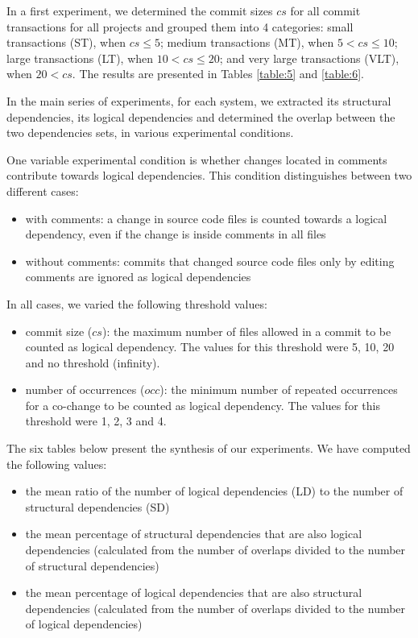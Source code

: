 \documentclass[a4paper,twoside]{article}
\begin{document}
In a first experiment, we determined the commit sizes $cs$ for all commit transactions for all projects and grouped them into 4 categories: small transactions (ST), when 	$cs\leq 5$; medium transactions (MT), when 	$5 < cs\leq 10$; large transactions (LT), when 	$10 < cs\leq 20$; and very large transactions (VLT), when 	$20 < cs$. The results are presented in Tables \ref{table:5} and \ref{table:6}.

In the main series of experiments, for each system, we extracted its structural dependencies, its logical dependencies and determined the overlap between the two dependencies sets, in various experimental conditions. 

One variable experimental condition is whether changes located in comments contribute towards logical dependencies. This condition distinguishes between two different cases: 
\begin{itemize}
	\item with comments: a change in source code files is counted towards a logical dependency, even if the change is inside comments in all files
	\item without comments: commits that changed source code files only by editing comments are ignored as logical dependencies
\end{itemize}

In all cases, we varied the following threshold values: 
 \begin{itemize}
	\item commit size ($cs$): the maximum number of files allowed in a commit to be counted as logical dependency. The values for this threshold were 5, 10, 20 and no threshold (infinity).  
	\item number of occurrences ($occ$): the minimum number of repeated occurrences for a co-change to be counted as logical dependency. The values for this threshold were 1, 2, 3 and 4.  
\end{itemize}

The six tables below present the synthesis of our experiments. 
We have computed the following  values:
\begin{itemize}
	\item the mean ratio of the number of logical dependencies  (LD) to the number of structural dependencies (SD)
   \item the mean percentage of structural dependencies that are also logical dependencies (calculated from the number of overlaps divided to the number of structural dependencies)	
		\item the mean percentage of logical dependencies that are also structural dependencies (calculated from the number of overlaps divided to the number of logical dependencies)
\end{itemize}
\end{document}
